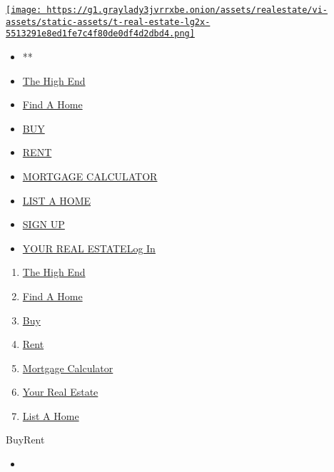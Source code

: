 \href{/section/realestate}{\texttt{[image: https://g1.graylady3jvrrxbe.onion/assets/realestate/vi-assets/static-assets/t-real-estate-lg2x-5513291e8ed1fe7c4f80de0df4d2dbd4.png]}}

\begin{itemize}
\tightlist
\item
  **
\item
  \href{/real-estate/the-high-end}{The High End}
\item
  \href{/real-estate/find-a-home}{Find A Home}
\item
  \href{/real-estate/homes-for-sale}{BUY}
\item
  \href{/real-estate/homes-for-rent}{RENT}
\item
  \href{/real-estate/mortgage-calculator}{MORTGAGE CALCULATOR}
\item
  \href{https://nytimesads.gtspayments.com}{LIST A HOME}
\item
  \href{https://myaccount.nytimes3xbfgragh.onion/auth/register?client_id=real.estate.ui\&display=control\&redirect_uri=\%2Freal-estate\%2Fhomes-for-sale\%3F\&response_type=cookie}{SIGN
  UP}
\item
  \href{https://myaccount.nytimes3xbfgragh.onion/auth/login?client_id=real.estate.ui\&display=control\&redirect_uri=\%2Freal-estate\%2Fhomes-for-sale\%3F\&response_type=cookie}{YOUR
  REAL ESTATELog In}
\end{itemize}

\begin{enumerate}
\def\labelenumi{\arabic{enumi}.}
\tightlist
\item
  \href{/real-estate/the-high-end}{The High End}
\item
  \href{/real-estate/find-a-home}{Find A Home}
\item
  \href{/real-estate/homes-for-sale}{Buy}
\item
  \href{/real-estate/homes-for-rent}{Rent}
\item
  \href{/real-estate/mortgage-calculator}{Mortgage Calculator}
\item
  \href{/real-estate/my-real-estate}{Your Real Estate}
\item
  \href{https://nytimesads.gtspayments.com/}{List A Home}
\end{enumerate}

BuyRent

\begin{itemize}
\item
\end{itemize}

